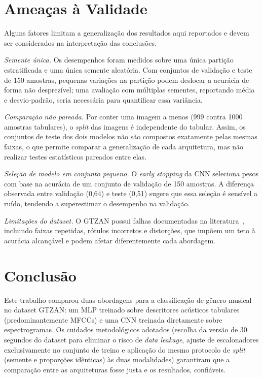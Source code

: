 \documentclass[conference]{IEEEtran}
\begin{document}
	\section{Ameaças à Validade}
	
	Alguns fatores limitam a generalização dos resultados aqui reportados e devem ser considerados na interpretação das conclusões.
	
	\textit{Semente única.} Os desempenhos foram medidos sobre uma única partição estratificada e uma única semente aleatória. Com conjuntos de validação e teste de 150 amostras, pequenas variações na partição podem deslocar a acurácia de forma não desprezível; uma avaliação com múltiplas sementes, reportando média e desvio-padrão, seria necessária para quantificar essa variância.
	
	\textit{Comparação não pareada.} Por conter uma imagem a menos (999 contra 1000 amostras tabulares), o \textit{split} das imagens é independente do tabular. Assim, os conjuntos de teste dos dois modelos não são compostos exatamente pelas mesmas faixas, o que permite comparar a generalização de cada arquitetura, mas não realizar testes estatísticos pareados entre elas.
	
	\textit{Seleção de modelo em conjunto pequeno.} O \textit{early stopping} da CNN seleciona pesos com base na acurácia de um conjunto de validação de 150 amostras. A diferença observada entre validação (0,64) e teste (0,51) sugere que essa seleção é sensível a ruído, tendendo a superestimar o desempenho na validação.
	
	\textit{Limitações do dataset.} O GTZAN possui falhas documentadas na literatura~\cite{sturm2013}, incluindo faixas repetidas, rótulos incorretos e distorções, que impõem um teto à acurácia alcançável e podem afetar diferentemente cada abordagem.
	
	\section{Conclusão}
	\label{sec:conclusao}
	Este trabalho comparou duas abordagens para a classificação de gênero musical no dataset GTZAN: um MLP treinado sobre descritores acústicos tabulares (predominantemente MFCCs) e uma CNN treinada diretamente sobre espectrogramas. Os cuidados metodológicos adotados (escolha da versão de 30 segundos do dataset para eliminar o risco de \textit{data leakage}, ajuste de escalonadores exclusivamente no conjunto de treino e aplicação do mesmo protocolo de \textit{split} (semente e proporções idênticas) às duas modalidades) garantiram que a comparação entre as arquiteturas fosse justa e os resultados, confiáveis.
	
\end{document}
